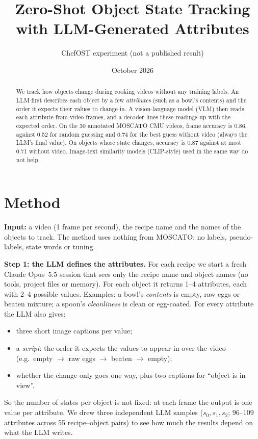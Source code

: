 \documentclass[10pt]{article}
\title{Zero-Shot Object State Tracking with LLM-Generated Attributes}
\author{ChefOST experiment (not a published result)}
\date{October 2026}
\begin{document}
\maketitle
\vspace{-1.5em}
\begin{abstract}
\noindent We track how objects change during cooking videos without any training labels. An LLM first describes each object by a few \emph{attributes} (such as a bowl's contents) and the order it expects their values to change in. A vision-language model (VLM) then reads each attribute from video frames, and a decoder lines these readings up with the expected order. On the 30 annotated MOSCATO CMU videos, frame accuracy is 0.86, against 0.52 for random guessing and 0.74 for the best guess without video (always the LLM's final value). On objects whose state changes, accuracy is 0.87 against at most 0.71 without video. Image-text similarity models (CLIP-style) used in the same way do not help.
\end{abstract}

\section{Method}
\textbf{Input:} a video (1 frame per second), the recipe name and the names of the objects to track. The method uses nothing from MOSCATO: no labels, pseudo-labels, state words or tuning.

\textbf{Step 1: the LLM defines the attributes.} For each recipe we start a fresh Claude Opus~5.5 session that sees only the recipe name and object names (no tools, project files or memory). For each object it returns 1--4 attributes, each with 2--4 possible values. Examples: a bowl's \emph{contents} is empty, raw eggs or beaten mixture; a spoon's \emph{cleanliness} is clean or egg-coated. For every attribute the LLM also gives:
\begin{itemize}
\item three short image captions per value;
\item a \emph{script}: the order it expects the values to appear in over the video (e.g.\ empty $\to$ raw eggs $\to$ beaten $\to$ empty);
\item whether the change only goes one way, plus two captions for ``object is in view''.
\end{itemize}
So the number of states per object is not fixed: at each frame the output is one value per attribute. We drew three independent LLM samples ($s_0,s_1,s_2$; 96--109 attributes across 55 recipe--object pairs) to see how much the results depend on what the LLM writes.
\end{document}
